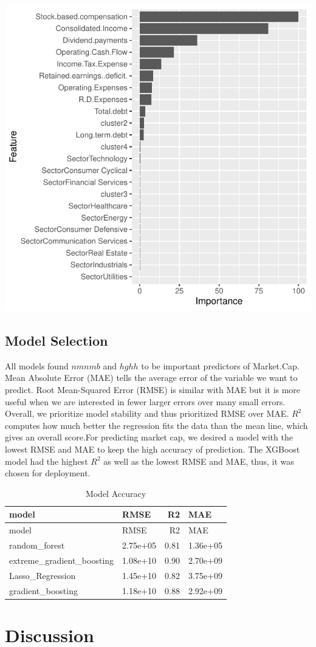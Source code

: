 \documentclass[11pt,]{article}
\begin{document}
\begin{center}\includegraphics{stock_analysis_files/figure-latex/gradient boosting-1} \end{center}

\hypertarget{model-selection}{%
\subsection{Model Selection}\label{model-selection}}

All models found \(nmnmb\) and \(hghh\) to be important predictors of
Market.Cap. Mean Absolute Error (MAE) tells the average error of the
variable we want to predict. Root Mean-Squared Error (RMSE) is similar
with MAE but it is more useful when we are interested in fewer larger
errors over many small errors. Overall, we prioritize model stability
and thus prioritized RMSE over MAE. \(R^2\) computes how much better the
regression fits the data than the mean line, which gives an overall
score.For predicting market cap, we desired a model with the lowest RMSE
and MAE to keep the high accuracy of prediction. The XGBoost model had
the highest \(R^2\) as well as the lowest RMSE and MAE, thus, it was
chosen for deployment.

\begin{longtable}[]{@{}llrl@{}}
\caption{Model Accuracy}\tabularnewline
\toprule
model & RMSE & R2 & MAE\tabularnewline
\midrule
\endfirsthead
\toprule
model & RMSE & R2 & MAE\tabularnewline
\midrule
\endhead
random\_forest & 2.75e+05 & 0.81 & 1.36e+05\tabularnewline
extreme\_gradient\_boosting & 1.08e+10 & 0.90 & 2.70e+09\tabularnewline
Lasso\_Regression & 1.45e+10 & 0.82 & 3.75e+09\tabularnewline
gradient\_boosting & 1.18e+10 & 0.88 & 2.92e+09\tabularnewline
\bottomrule
\end{longtable}

\hypertarget{discussion}{%
\section{Discussion}\label{discussion}}





\newpage
\singlespacing 
\end{document}
